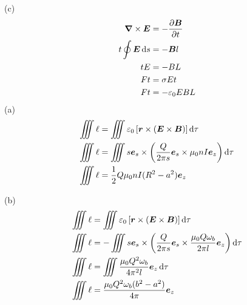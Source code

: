 (c)\begin{align*}
    \boldsymbol{\nabla}\times\boldsymbol{E}&=-\frac{\partial \boldsymbol{B}}{\partial t}\\
    t\oint\boldsymbol{E}\dif s&=-\boldsymbol{B}l\\
    tE&=-BL\\
    Ft&=\sigma Et\\
    Ft&=-\varepsilon_0E BL
\end{align*}
(a)\begin{align*}
    \iiint\ell&=\iiint\varepsilon_0\left[\boldsymbol{r}\times(\boldsymbol E\times\boldsymbol B)\right]\dif\tau\\
    \iiint\ell&=\iiint s\boldsymbol{e}_s\times\left(\frac{Q}{2\pi s}\boldsymbol{e}_s\times\mu_0nI\boldsymbol{e}_z\right)\dif\tau\\
    \iiint\ell&=\frac12Q\mu_0nI(R^2-a^2)\boldsymbol{e}_z
\end{align*}

(b)\begin{align*}
    \iiint\ell&=\iiint\varepsilon_0\left[\boldsymbol{r}\times(\boldsymbol E\times\boldsymbol B)\right]\dif\tau\\
    \iiint\ell&=-\iiint s\boldsymbol{e}_s\times\left(\frac{Q}{2\pi s}\boldsymbol{e}_s\times\frac{\mu_0Q\omega_b}{2\pi l}\boldsymbol{e}_z\right)\dif\tau\\
    \iiint\ell&=\iiint\frac{\mu_0Q^2\omega_b}{4\pi^2 l}\boldsymbol{e}_z\dif\tau\\
    \iiint\ell&=\frac{\mu_0Q^2\omega_b(b^2-a^2)}{4\pi}\boldsymbol{e}_z
\end{align*}

